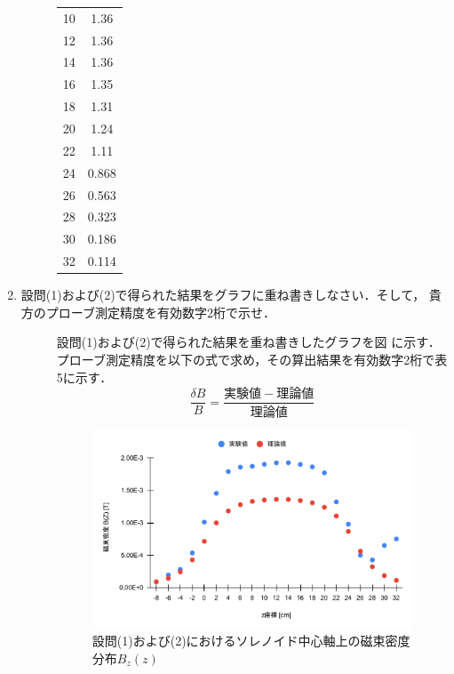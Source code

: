 \begin{enumerate}
\begin{description}
\begin{table}[H]
\begin{tabular}{c|c}
                10 & 1.36 \\ 
                12 & 1.36 \\ 
                14 & 1.36 \\ 
                16 & 1.35 \\ 
                18 & 1.31 \\ 
                20 & 1.24 \\ 
                22 & 1.11 \\ 
                24 & 0.868 \\ 
                26 & 0.563 \\ 
                28 & 0.323 \\ 
                30 & 0.186 \\ 
                32 & 0.114 \\ \hline
            \end{tabular}
        \end{table}
    \end{description}

    \newpage
    
    \item 設問(1)および(2)で得られた結果をグラフに重ね書きしなさい．そして，
    貴方のプローブ測定精度を有効数字2桁で示せ．
    \begin{description}
        \item[] 設問(1)および(2)で得られた結果を重ね書きしたグラフを図 に示す．
        プローブ測定精度を以下の式で求め，その算出結果を有効数字2桁で表5に示す．
        $$
        \frac{\delta B}{B}=\frac{実験値-理論値}{理論値}
        $$
        \begin{figure}[H]
            \centering
            \includegraphics[scale=0.75]{compare.pdf}
            \caption{設問(1)および(2)におけるソレノイド中心軸上の磁束密度分布$B_z(z)$}
        \end{figure}


\end{description}
\end{enumerate}
